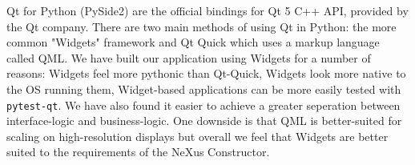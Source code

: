 Qt for Python (PySide2) are the official bindings for Qt 5 C++ API, provided by the Qt company. There are two main methods of using Qt in Python: the more common "Widgets" framework and Qt Quick which uses a markup language called QML. We have built our application using Widgets for a number of reasons: Widgets feel more pythonic than Qt-Quick, Widgets look more native to the OS running them, Widget-based applications can be more easily tested with \texttt{pytest-qt}. We have also found it easier to achieve a greater seperation between interface-logic and business-logic. One downside is that QML is better-suited for scaling on high-resolution displays but overall we feel that Widgets are better suited to the requirements of the NeXus Constructor.
\iffalse
\bigskip
The code snippet below shows the usage of a typical Qt3D view in python. Qt3D provides some high-level geometry types for adding cylinders, meshes, spheres as well as several other shapes. This is all wrapping OpenGL, and in the future Qt have stated they will support other graphics engines such as DirectX12, Vulkan and Metal. Currently there is some limited support for vulkan using the QVulkanWindow with a QVulkanInstance.
\fi
